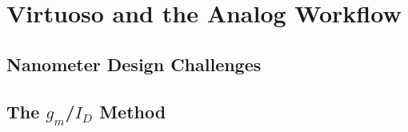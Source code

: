 \documentclass[../main.tex]{subfiles}
\begin{document}
\section{Virtuoso and the Analog Workflow}

\subsection{Nanometer Design Challenges}

\subsection{The $g_m$/$I_D$ Method}
\end{document}
